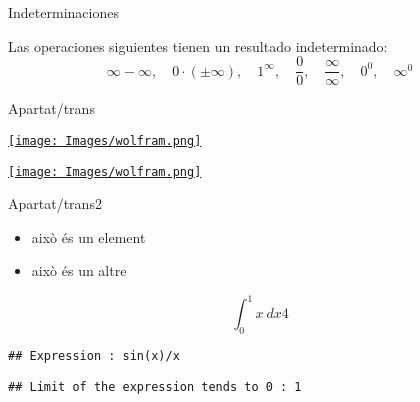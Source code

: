 \documentclass[
  ignorenonframetext,
]{beamer}
\providecommand{\tightlist}{%
  \setlength{\itemsep}{0pt}\setlength{\parskip}{0pt}}
\begin{document}
\begin{frame}{Indeterminaciones}
\protect\hypertarget{indeterminaciones}{}

Las operaciones siguientes tienen un resultado indeterminado: \[
\infty - \infty, \quad 0\cdot (\pm \infty), \quad 1^{\infty}, \quad \frac{0}{0}, \quad  \frac{\infty}{\infty}, \quad 0^0, \quad  \infty^0
\]

\end{frame}

\begin{frame}{Apartat/trans}
\protect\hypertarget{apartattrans}{}

\href{https://www.wolframalpha.com/input/?i=taylor+series+arctan\%281\%2F\%281\%2Bx\%5E6\%29\%29+at+x+\%3D+pi\%2F4}{\texttt{[image: Images/wolfram.png]}}

\href{https://www.wolframalpha.com/input/?i=6\%2F7+with+48+decimals}{\texttt{[image: Images/wolfram.png]}}

\end{frame}

\begin{frame}[fragile]{Apartat/trans2}
\protect\hypertarget{apartattrans2}{}

\begin{itemize}
\tightlist
\item
  això és un element
\item
  això és un altre
\end{itemize}

\[\int_0^1 x\ dx 4\]

\begin{verbatim}
## Expression : sin(x)/x
\end{verbatim}

\begin{verbatim}
## Limit of the expression tends to 0 : 1
\end{verbatim}

\end{frame}
\end{document}
